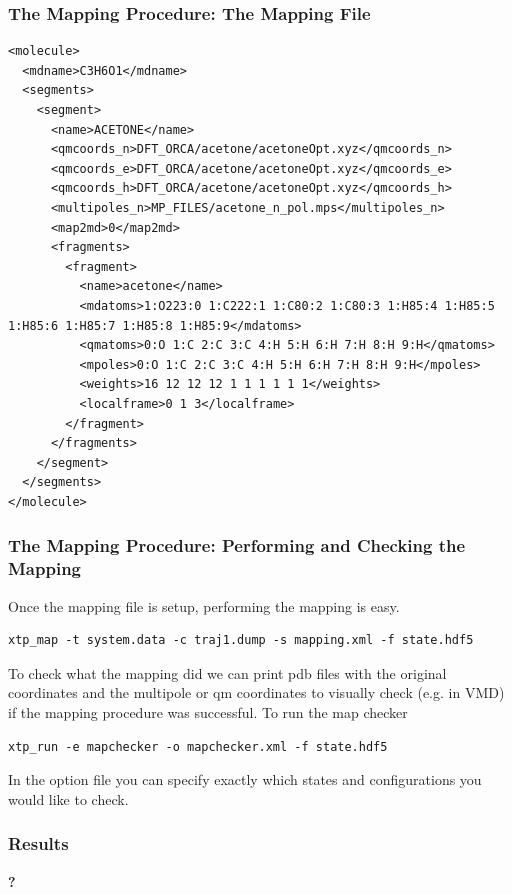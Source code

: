 \documentclass[t,aspectratio=169, 8pt]{beamer}
\begin{document}
\begin{frame}[fragile]
  \frametitle{The Mapping Procedure: The Mapping File}  

  \begin{verbatim}
<molecule>
  <mdname>C3H6O1</mdname>
  <segments>
    <segment>
      <name>ACETONE</name>
      <qmcoords_n>DFT_ORCA/acetone/acetoneOpt.xyz</qmcoords_n>
      <qmcoords_e>DFT_ORCA/acetone/acetoneOpt.xyz</qmcoords_e>
      <qmcoords_h>DFT_ORCA/acetone/acetoneOpt.xyz</qmcoords_h>
      <multipoles_n>MP_FILES/acetone_n_pol.mps</multipoles_n>
      <map2md>0</map2md>
      <fragments>
        <fragment>
          <name>acetone</name>
          <mdatoms>1:O223:0 1:C222:1 1:C80:2 1:C80:3 1:H85:4 1:H85:5 1:H85:6 1:H85:7 1:H85:8 1:H85:9</mdatoms>
          <qmatoms>0:O 1:C 2:C 3:C 4:H 5:H 6:H 7:H 8:H 9:H</qmatoms>
          <mpoles>0:O 1:C 2:C 3:C 4:H 5:H 6:H 7:H 8:H 9:H</mpoles>
          <weights>16 12 12 12 1 1 1 1 1 1</weights>
          <localframe>0 1 3</localframe>
        </fragment>
      </fragments>
    </segment>
  </segments>
</molecule>
  \end{verbatim}
\end{frame}

\begin{frame}[fragile]
  \frametitle{The Mapping Procedure: Performing and Checking the Mapping}  
  Once the mapping file is setup, performing the mapping is easy.

  \begin{verbatim}
xtp_map -t system.data -c traj1.dump -s mapping.xml -f state.hdf5
  \end{verbatim}

  To check what the mapping did we can print pdb files with the original coordinates and the multipole or qm coordinates to visually check (e.g. in VMD) if the mapping procedure was successful. To run the map checker
  \begin{verbatim}
xtp_run -e mapchecker -o mapchecker.xml -f state.hdf5
  \end{verbatim}
  In the option file you can specify exactly which states and configurations you would like to check.
\end{frame}


\begin{chapterframe}
  \frametitle{Results}
  \vspace{0.5cm}
  \begin{center}
    {\fontsize{60}{64} \selectfont \bfseries{?}}
  \end{center}
\end{chapterframe}
\end{document}

